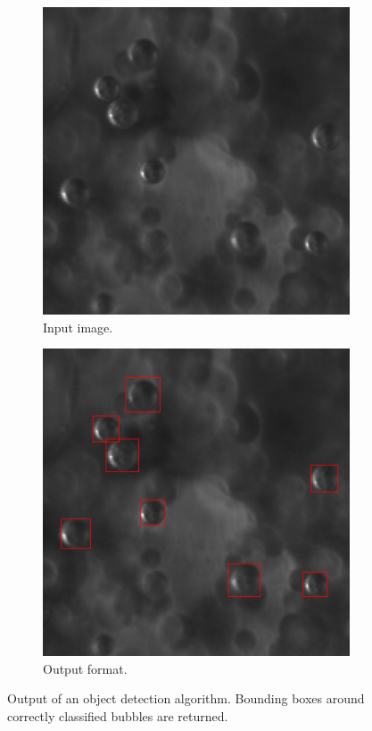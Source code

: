 		\begin{figure}
			\centering
			\begin{subfigure}[t]{0.4\linewidth}
				\centering
				\includegraphics[scale=.4]{images/object_detection_intro_1.png}
				\caption{Input image.}
			\end{subfigure}
			\begin{subfigure}[t]{0.4\linewidth}
				\centering
				\includegraphics[scale=.4]{images/object_detection_intro_2.png}
				\caption{Output format.}
			\end{subfigure}
			\caption{Output of an object detection algorithm. Bounding boxes around correctly classified bubbles are returned.}
			\label{fig:obj_detec_intro}
		\end{figure}
	
